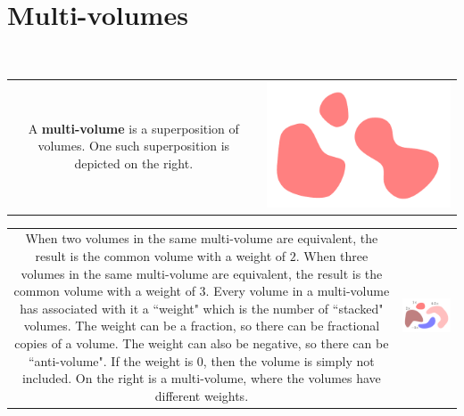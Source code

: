 \documentclass{book}
\begin{document}
\section{Multi-volumes}

~

\begin{tabular}{cc}
\parbox{0.5\textwidth}{
A \textbf{multi-volume} is a superposition of volumes. One such superposition is depicted on the right.
} & \parbox{0.5\textwidth}{
\includegraphics[scale = 0.75]{Multi-structures/Multivolumes/multi-volume_simple}
}
\end{tabular}

\begin{tabular}{cc}
\parbox{0.5\textwidth}{
When two volumes in the same multi-volume are equivalent, the result is the common volume with a weight of \(2\). When three volumes in the same multi-volume are equivalent, the result is the common volume with a weight of \(3\). Every volume in a multi-volume has associated with it a ``weight" which is the number of ``stacked" volumes. The weight can be a fraction, so there can be fractional copies of a volume. The weight can also be negative, so there can be ``anti-volume". If the weight is \(0\), then the volume is simply not included. On the right is a multi-volume, where the volumes have different weights.
} & \parbox{0.5\textwidth}{
\includegraphics[scale = 0.75]{Multi-structures/Multivolumes/multi-volume_multiplicity}
}
\end{tabular}
\end{document}
